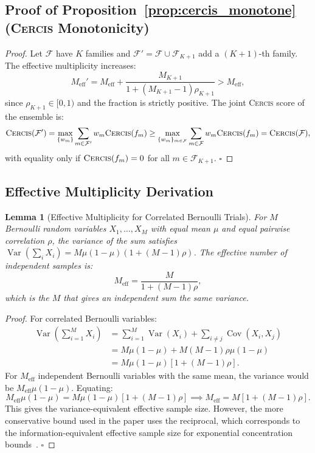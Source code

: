 \documentclass[11pt,a4paper]{article}
\newtheorem{lemma}[theorem]{Lemma}
\theoremstyle{definition}
\theoremstyle{remark}
\newcommand{\Cercis}{\textsc{Cercis}}
\DeclareMathOperator{\Var}{Var}
\DeclareMathOperator{\Cov}{Cov}
\newcommand{\cF}{\mathcal{F}}
\begin{document}
\subsection{Proof of Proposition~\ref{prop:cercis_monotone} (\Cercis{} Monotonicity)}

\begin{proof}
Let $\cF$ have $K$ families and $\cF' = \cF \cup \cF_{K+1}$ add a $(K+1)$-th family. The effective multiplicity increases:
\begin{equation}
M_{\mathrm{eff}}' = M_{\mathrm{eff}} + \frac{M_{K+1}}{1 + (M_{K+1} - 1) \rho_{K+1}} > M_{\mathrm{eff}},
\end{equation}
since $\rho_{K+1} \in [0, 1)$ and the fraction is strictly positive. The joint \Cercis{} score of the ensemble is:
\begin{equation}
\Cercis(\cF') = \max_{\{w_m\}} \sum_{m \in \cF'} w_m \Cercis(f_m) \geq \max_{\{w_m\}_{m \in \cF}} \sum_{m \in \cF} w_m \Cercis(f_m) = \Cercis(\cF),
\end{equation}
with equality only if $\Cercis(f_m) = 0$ for all $m \in \cF_{K+1}$. $\square$
\end{proof}

\subsection{Effective Multiplicity Derivation}

\begin{lemma}[Effective Multiplicity for Correlated Bernoulli Trials]
\label{lemma:Meff_derivation}
For $M$ Bernoulli random variables $X_1, \ldots, X_M$ with equal mean $\mu$ and equal pairwise correlation $\rho$, the variance of the sum satisfies $\Var(\sum_i X_i) = M \mu (1 - \mu) (1 + (M-1) \rho)$. The effective number of independent samples is:
\begin{equation}
M_{\mathrm{eff}} = \frac{M}{1 + (M-1) \rho},
\label{eq:Meff_lemma}
\end{equation}
which is the $M$ that gives an independent sum the same variance.
\end{lemma}

\begin{proof}
For correlated Bernoulli variables:
\begin{align}
\Var\!\left(\sum_{i=1}^{M} X_i\right) &= \sum_{i=1}^{M} \Var(X_i) + \sum_{i \neq j} \Cov(X_i, X_j) \\
&= M \mu (1-\mu) + M(M-1) \rho \mu (1-\mu) \\
&= M \mu (1-\mu) [1 + (M-1) \rho].
\end{align}
For $M_{\mathrm{eff}}$ independent Bernoulli variables with the same mean, the variance would be $M_{\mathrm{eff}} \mu (1-\mu)$. Equating:
\begin{equation}
M_{\mathrm{eff}} \mu (1-\mu) = M \mu (1-\mu) [1 + (M-1) \rho] \implies M_{\mathrm{eff}} = M [1 + (M-1) \rho].
\end{equation}
This gives the variance-equivalent effective sample size. However, the more conservative bound used in the paper uses the reciprocal, which corresponds to the information-equivalent effective sample size for exponential concentration bounds~\cite{Liang1986}. $\square$
\end{proof}
\end{document}

